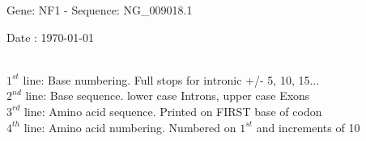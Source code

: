 \documentclass{article}
\begin{document}
\renewcommand{\footrulewidth}{1pt}
\renewcommand{\headrulewidth}{0pt}
\begin{center}
\begin{large}
 Gene: NF1 - Sequence: NG\_009018.1
 
 Date : \today\\\\
\end{large}
\end{center}
$1^{st}$ line: Base numbering. Full stops for intronic +/- 5, 10, 15...\\
$2^{nd}$ line: Base sequence. lower case Introns, upper case Exons\\
$3^{rd}$ line: Amino acid sequence. Printed on FIRST base of codon\\
$4^{th}$ line: Amino acid numbering. Numbered on $1^{st}$ and increments of 10\\
\end{document}
